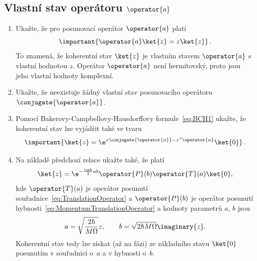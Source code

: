 \subsection{Vlastní stav operátoru $\operator{a}$}
\begin{enumerate}
\item 
    Ukažte, že pro posunovací operátor $\operator{a}$ platí
    \begin{equation}
        \label{eq:HOCoherentStateA}
        \important{\operator{a}\ket{z}=z\ket{z}}\,.
    \end{equation}
    To znamená, že koherentní stav $\ket{z}$ je vlastním stavem $\operator{a}$ 
    s vlastní hodnotou $z$.
    Operátor $\operator{a}$ není hermitovský, proto jsou jeho vlastní hodnoty komplexní.

\item 
    Ukažte, že neexistuje žádný vlastní stav posunovacího operátoru $\conjugate{\operator{a}}$.

\item 
    Pomocí Bakerovy-Campbellovy-Hausdorffovy formule~\eqref{eq:BCH1} ukažte, 
    že koherentní stav lze vyjádřit také ve tvaru
    \begin{equation}
		\label{eq:HOCoherentStateFromVacuum}
        \important{\ket{z}=\e^{z\conjugate{\operator{a}}-z^{*}\operator{a}}\ket{0}}\,.
    \end{equation}

\item 
	Na základě předchozí relace ukažte také, že platí
	\begin{equation}
		\label{eq:HOCoherentStateFromPositionMomentum}
		\ket{z}=\e^{-\frac{\im\hbar}{2}ab}\operator{P}(b)\operator{T}(a)\ket{0},
	\end{equation}
	kde $\operator{T}(a)$ je operátor posunutí souřadnice~\eqref{eq:TranslationOperator} a $\operator{P}(b)$ je operátor posunutí hybnosti~\eqref{eq:MomentumTranslationOperator} a hodnoty parametrů $a$, $b$ jsou
	\begin{equation}\label{eq:HOCoherentStateab}
		a=\sqrt{\frac{2\hbar}{M\Omega}}\real{z},\qquad
		b=\sqrt{2\hbar M\Omega}\imaginary{z}.
	\end{equation}
	Koherentní stav tedy lze získat (až na fázi) ze základního stavu $\ket{0}$ posunutím v souřadnici o~$a$ a v hybnosti o~$b$.

\end{enumerate}

